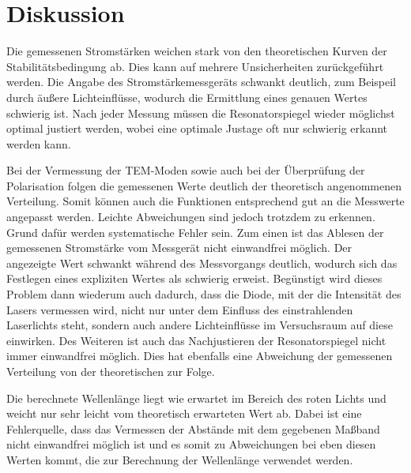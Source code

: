 \section{Diskussion}
\label{sec:Diskussion}
Die gemessenen Stromstärken weichen stark von den theoretischen Kurven der Stabilitätsbedingung ab. Dies kann auf
mehrere Unsicherheiten zurückgeführt werden. Die Angabe des Stromstärkemessgeräts schwankt deutlich, zum Beispeil durch äußere Lichteinflüsse, wodurch
die Ermittlung eines genauen Wertes schwierig ist. Nach jeder Messung müssen die Resonatorspiegel wieder
möglichst optimal justiert werden, wobei eine optimale Justage oft nur schwierig erkannt werden kann.


Bei der Vermessung der TEM-Moden sowie auch bei der Überprüfung der Polarisation
folgen die gemessenen Werte deutlich der theoretisch angenommenen Verteilung. Somit
können auch die Funktionen entsprechend gut an die Messwerte angepasst werden.
Leichte Abweichungen sind jedoch trotzdem zu erkennen. Grund dafür werden systematische
Fehler sein. Zum einen ist das Ablesen der gemessenen Stromstärke vom Messgerät nicht
einwandfrei möglich. Der angezeigte Wert schwankt während des Messvorgangs deutlich,
wodurch sich das Festlegen eines expliziten Wertes als schwierig erweist. Begünstigt wird
dieses Problem dann wiederum auch dadurch, dass die Diode, mit der die Intensität des Lasers
vermessen wird, nicht nur unter dem Einfluss des einstrahlenden Laserlichts steht, sondern
auch andere Lichteinflüsse im Versuchsraum auf diese einwirken. Des Weiteren ist auch
das Nachjustieren der Resonatorspiegel nicht immer einwandfrei möglich. Dies hat ebenfalls
eine Abweichung der gemessenen Verteilung von der theoretischen zur Folge.

Die berechnete Wellenlänge liegt wie erwartet im Bereich des roten Lichts und weicht
nur sehr leicht vom theoretisch erwarteten Wert ab. Dabei ist eine Fehlerquelle,
dass das Vermessen der Abstände mit dem gegebenen Maßband nicht einwandfrei
möglich ist und es somit zu Abweichungen bei eben diesen Werten kommt, die zur Berechnung
der Wellenlänge verwendet werden.
